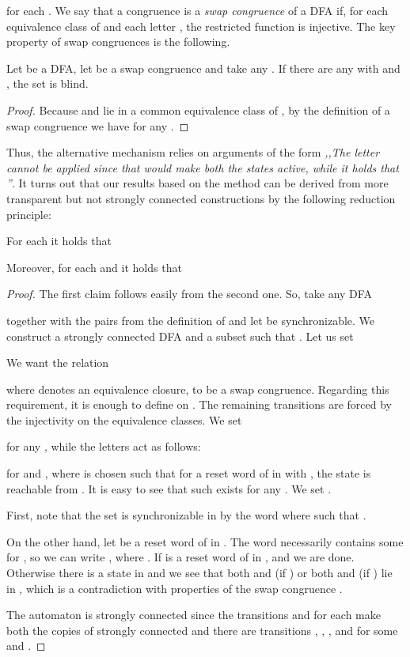 \documentclass{ws-ijmpc}
\begin{document}
for each . We say that a congruence  is a \emph{swap
congruence} of a DFA if, for each equivalence class  of 
and each letter , the restricted function 
is injective. The key property of swap congruences is the following.
\begin{lemma}
Let  be a DFA, let 
be a swap congruence and take any . If there are any
 with  and , the set  is blind.\end{lemma}
\begin{proof}
Because  and  lie in a common equivalence class of ,
by the definition of a swap congruence we have 
for any .
\end{proof}
Thus, the alternative mechanism relies on arguments of the form \emph{,,The
letter  cannot be applied since that would make both the states
 active, while it holds that ''}. It turns out that
our results based on the method can be derived from more transparent
but not strongly connected constructions by the following reduction
principle: 
\begin{lemma}
\label{lem: sub sc}For each  it holds that 

Moreover, for each  and  it holds that

\end{lemma}
\begin{proof}
The first claim follows easily from the second one. So, take any DFA

together with the pairs 
from the definition of  and let 
be synchronizable. We construct a strongly connected DFA 
and a subset  such that .
Let us set

We want the relation

where  denotes an equivalence closure,
to be a swap congruence. Regarding this requirement, it is enough
to define  on .
The remaining transitions are forced by the injectivity on the equivalence
classes. We set

for any , while the letters 
act as follows: 

for  and , where  is chosen such that for
a reset word  of  in  with ,
the state  is reachable from . It is easy to see that
such  exists for any . We set .
\begin{itemlist}
\item First, note that the set  is synchronizable in  by the
word  where  such that . 
\item On the other hand, let  be a reset word of  in . The
word  necessarily contains some  for ,
so we can write , where .
If  is a reset word of  in , 
and we are done. Otherwise there is a state  in 
and we see that both  and  (if )
or both  and  (if )
lie in , which is a contradiction
with properties of the swap congruence .
\end{itemlist}
The automaton  is strongly connected since the transitions 
and 
for each  make both the copies of  strongly connected
and there are transitions ,
 , ,
and  for
some  and .
\end{proof}
\end{document}

